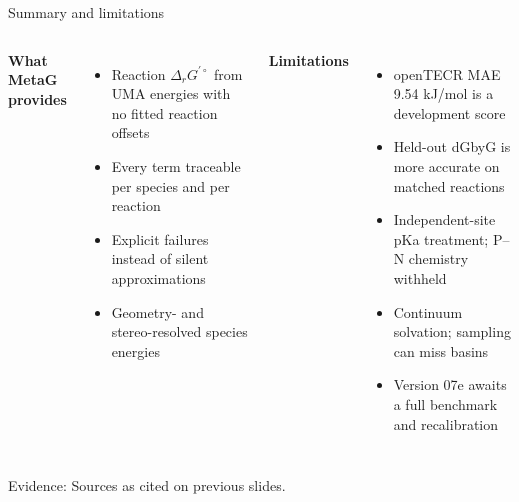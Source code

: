 \documentclass[aspectratio=169,11pt]{beamer}
\newcommand{\src}[1]{\vfill{\tiny\color{muted}Evidence: #1\par}}
\newcommand{\dg}{\Delta_r G^{\prime\circ}}
\newcommand{\gap}{\vspace{.18cm}}
\begin{document}
\begin{frame}{Summary and limitations}
\begin{columns}[T]
\textbf{What MetaG provides}\gap
\begin{itemize}
\item Reaction $\dg$ from UMA energies with no fitted reaction offsets
\item Every term traceable per species and per reaction
\item Explicit failures instead of silent approximations
\item Geometry- and stereo-resolved species energies
\end{itemize}
\textbf{Limitations}\gap
\begin{itemize}
\item openTECR MAE 9.54 kJ/mol is a development score
\item Held-out dGbyG is more accurate on matched reactions
\item Independent-site pKa treatment; P--N chemistry withheld
\item Continuum solvation; sampling can miss basins
\item Version 07e awaits a full benchmark and recalibration
\end{itemize}
\end{columns}
\src{Sources as cited on previous slides.}
\end{frame}
\end{document}
